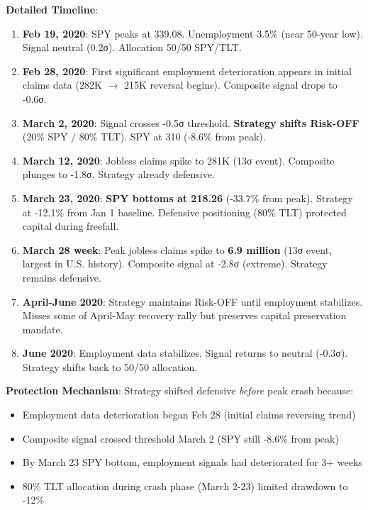 \documentclass[12pt,a4paper]{article}
\begin{document}
\textbf{Detailed Timeline}:

\begin{enumerate}
    \item \textbf{Feb 19, 2020}: SPY peaks at 339.08. Unemployment 3.5\% (near 50-year low). Signal neutral (0.2σ). Allocation 50/50 SPY/TLT.

    \item \textbf{Feb 28, 2020}: First significant employment deterioration appears in initial claims data (282K $\rightarrow$ 215K reversal begins). Composite signal drops to -0.6σ.

    \item \textbf{March 2, 2020}: Signal crosses -0.5σ threshold. \textbf{Strategy shifts Risk-OFF} (20\% SPY / 80\% TLT). SPY at 310 (-8.6\% from peak).

    \item \textbf{March 12, 2020}: Jobless claims spike to 281K (13σ event). Composite plunges to -1.8σ. Strategy already defensive.

    \item \textbf{March 23, 2020}: \textbf{SPY bottoms at 218.26} (-33.7\% from peak). Strategy at -12.1\% from Jan 1 baseline. Defensive positioning (80\% TLT) protected capital during freefall.

    \item \textbf{March 28 week}: Peak jobless claims spike to \textbf{6.9 million} (13σ event, largest in U.S. history). Composite signal at -2.8σ (extreme). Strategy remains defensive.

    \item \textbf{April-June 2020}: Strategy maintains Risk-OFF until employment stabilizes. Misses some of April-May recovery rally but preserves capital preservation mandate.

    \item \textbf{June 2020}: Employment data stabilizes. Signal returns to neutral (-0.3σ). Strategy shifts back to 50/50 allocation.
\end{enumerate}

\textbf{Protection Mechanism}: Strategy shifted defensive \textit{before} peak crash because:

\begin{itemize}
    \item Employment data deterioration began Feb 28 (initial claims reversing trend)
    \item Composite signal crossed threshold March 2 (SPY still -8.6\% from peak)
    \item By March 23 SPY bottom, employment signals had deteriorated for 3+ weeks
    \item 80\% TLT allocation during crash phase (March 2-23) limited drawdown to -12\%
\end{itemize}
\end{document}
